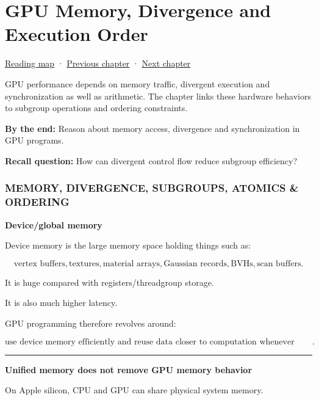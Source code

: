 \hypertarget{03-visual-computing-i-ch016}{}
\chapter{GPU Memory, Divergence and Execution Order}\label{03-visual-computing-i-ch016-gpu-memory-divergence-and-execution-order}

\hyperref[volume-reading-map]{Reading map} · \hyperref[03-visual-computing-i-ch015-rasterization-foundations-and-renderer-evidence]{Previous chapter} · \hyperref[03-visual-computing-i-ch017-build-test-and-reproduce-the-program]{Next chapter}

GPU performance depends on memory traffic, divergent execution and synchronization as well as arithmetic. The chapter links these hardware behaviors to subgroup operations and ordering constraints.

\textbf{By the end:} Reason about memory access, divergence and synchronization in GPU programs.

\textbf{Recall question:} How can divergent control flow reduce subgroup efficiency?

\subsection{MEMORY, DIVERGENCE, SUBGROUPS, ATOMICS \& ORDERING}\label{03-visual-computing-i-ch016-memory-divergence-subgroups-atomics-ordering}

\textbf{Device/global memory}

Device memory is the large memory space holding things such as:

\[
\text{vertex buffers},
\text{textures},
\text{material arrays},
\text{Gaussian records},
\text{BVHs},
\text{scan buffers}.
\]

It is huge compared with registers/threadgroup storage.

It is also much higher latency.

GPU programming therefore revolves around:

\[
\boxed{
\text{use device memory efficiently and reuse data closer to computation whenever possible}.
}
\]

\begin{center}\rule{0.5\linewidth}{0.5pt}\end{center}

\textbf{Unified memory does not remove GPU memory behavior}

On Apple silicon, CPU and GPU can share physical system memory.

